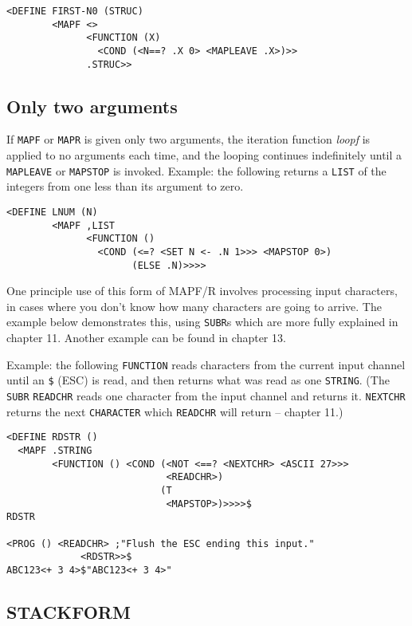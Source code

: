 \documentclass[a4paper]{scrbook}
\begin{document}
\begin{verbatim}
<DEFINE FIRST-N0 (STRUC)
        <MAPF <>
              <FUNCTION (X)
                <COND (<N==? .X 0> <MAPLEAVE .X>)>>
              .STRUC>>
\end{verbatim}

\subsection{Only two arguments}\label{only-two-arguments}

If \texttt{MAPF} or \texttt{MAPR} is given only two arguments, the iteration function \emph{loopf} is applied to no
arguments each time, and the looping continues indefinitely until a \texttt{MAPLEAVE} or \texttt{MAPSTOP} is invoked.
Example: the following returns a \texttt{LIST} of the integers from one less than its argument to zero.

\begin{verbatim}
<DEFINE LNUM (N)
        <MAPF ,LIST
              <FUNCTION ()
                <COND (<=? <SET N <- .N 1>>> <MAPSTOP 0>)
                      (ELSE .N)>>>>
\end{verbatim}

One principle use of this form of MAPF/R involves processing input characters, in cases where you don't know how many
characters are going to arrive. The example below demonstrates this, using \texttt{SUBR}s which are more fully explained in
chapter 11. Another example can be found in chapter 13.

Example: the following \texttt{FUNCTION} reads characters from the current input channel until an \texttt{\$} (ESC) is
read, and then returns what was read as one \texttt{STRING}. (The \texttt{SUBR} \texttt{READCHR} 
reads one character from the input channel and returns it. \texttt{NEXTCHR}  returns the next
\texttt{CHARACTER} which \texttt{READCHR} will return -- chapter 11.)

\begin{verbatim}
<DEFINE RDSTR ()
  <MAPF .STRING
        <FUNCTION () <COND (<NOT <==? <NEXTCHR> <ASCII 27>>>
                            <READCHR>)
                           (T
                            <MAPSTOP>)>>>>$
RDSTR

<PROG () <READCHR> ;"Flush the ESC ending this input."
             <RDSTR>>$
ABC123<+ 3 4>$"ABC123<+ 3 4>"
\end{verbatim}

\subsection{STACKFORM}\label{stackform}
\end{document}
